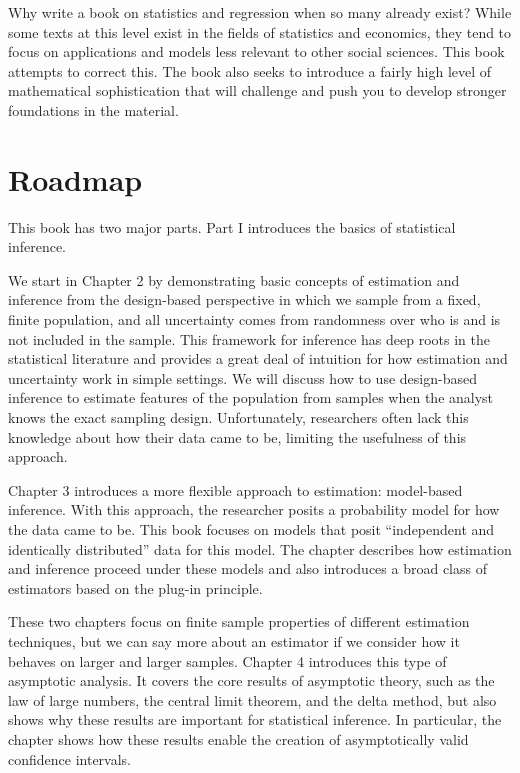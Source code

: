 \documentclass[
  letterpaper,
  DIV=11,
  numbers=noendperiod]{scrreprt}
\theoremstyle{plain}
\theoremstyle{definition}
\theoremstyle{definition}
\theoremstyle{remark}
\begin{document}
Why write a book on statistics and regression when so many already
exist? While some texts at this level exist in the fields of statistics
and economics, they tend to focus on applications and models less
relevant to other social sciences. This book attempts to correct this.
The book also seeks to introduce a fairly high level of mathematical
sophistication that will challenge and push you to develop stronger
foundations in the material.

\hypertarget{roadmap}{%
\section{Roadmap}\label{roadmap}}

This book has two major parts. Part I introduces the basics of
statistical inference.

We start in Chapter 2 by demonstrating basic concepts of estimation and
inference from the design-based perspective in which we sample from a
fixed, finite population, and all uncertainty comes from randomness over
who is and is not included in the sample. This framework for inference
has deep roots in the statistical literature and provides a great deal
of intuition for how estimation and uncertainty work in simple settings.
We will discuss how to use design-based inference to estimate features
of the population from samples when the analyst knows the exact sampling
design. Unfortunately, researchers often lack this knowledge about how
their data came to be, limiting the usefulness of this approach.

Chapter 3 introduces a more flexible approach to estimation: model-based
inference. With this approach, the researcher posits a probability model
for how the data came to be. This book focuses on models that posit
``independent and identically distributed'' data for this model. The
chapter describes how estimation and inference proceed under these
models and also introduces a broad class of estimators based on the
plug-in principle.

These two chapters focus on finite sample properties of different
estimation techniques, but we can say more about an estimator if we
consider how it behaves on larger and larger samples. Chapter 4
introduces this type of asymptotic analysis. It covers the core results
of asymptotic theory, such as the law of large numbers, the central
limit theorem, and the delta method, but also shows why these results
are important for statistical inference. In particular, the chapter
shows how these results enable the creation of asymptotically valid
confidence intervals.
\end{document}
